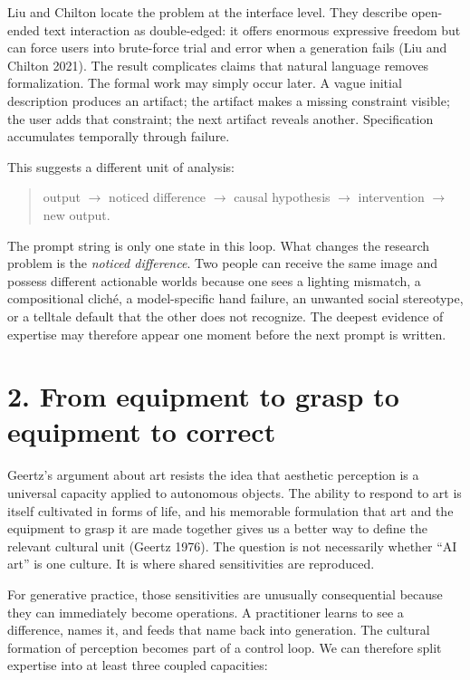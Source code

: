 \documentclass[
  11pt,
  letterpaper,
]{article}
\begin{document}
Liu and Chilton locate the problem at the interface level. They describe
open-ended text interaction as double-edged: it offers enormous
expressive freedom but can force users into brute-force trial and error
when a generation fails (Liu and Chilton 2021). The result complicates
claims that natural language removes formalization. The formal work may
simply occur later. A vague initial description produces an artifact;
the artifact makes a missing constraint visible; the user adds that
constraint; the next artifact reveals another. Specification accumulates
temporally through failure.

This suggests a different unit of analysis:

\begin{quote}
output $\rightarrow$ noticed difference $\rightarrow$ causal hypothesis $\rightarrow$ intervention $\rightarrow$ new output.
\end{quote}

The prompt string is only one state in this loop. What changes the
research problem is the \emph{noticed difference}. Two people can
receive the same image and possess different actionable worlds because
one sees a lighting mismatch, a compositional cliché, a model-specific
hand failure, an unwanted social stereotype, or a telltale default that
the other does not recognize. The deepest evidence of expertise may
therefore appear one moment before the next prompt is written.

\section{2. From equipment to grasp to equipment to
correct}\label{from-equipment-to-grasp-to-equipment-to-correct}

Geertz's argument about art resists the idea that aesthetic perception
is a universal capacity applied to autonomous objects. The ability to
respond to art is itself cultivated in forms of life, and his memorable
formulation that art and the equipment to grasp it are made together
gives us a better way to define the relevant cultural unit (Geertz
1976). The question is not necessarily whether ``AI art'' is one
culture. It is where shared sensitivities are reproduced.

For generative practice, those sensitivities are unusually consequential
because they can immediately become operations. A practitioner learns to
see a difference, names it, and feeds that name back into generation.
The cultural formation of perception becomes part of a control loop. We
can therefore split expertise into at least three coupled capacities:
\end{document}
